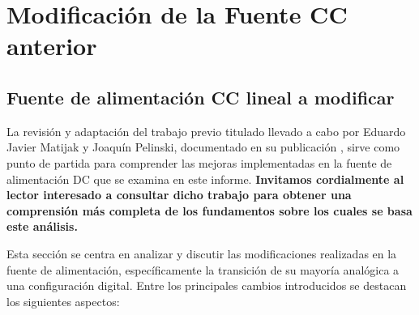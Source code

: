 \chapter{Modificación de la Fuente CC anterior}

\label{C:Sobre la fuente anterior}

\section{Fuente de alimentación CC lineal a modificar}
La revisión y adaptación del trabajo previo titulado  llevado a cabo por Eduardo Javier Matijak y Joaquín Pelinski, documentado en su publicación \cite{Fuente2023}, sirve como punto de partida para comprender las mejoras implementadas en la fuente de alimentación DC que se examina en este informe. \textbf{Invitamos cordialmente al lector interesado a consultar dicho trabajo para obtener una comprensión más completa de los fundamentos sobre los cuales se basa este análisis.} \par 
Esta sección se centra en analizar y discutir las modificaciones realizadas en la fuente de alimentación, específicamente la transición de su mayoría analógica a una configuración digital. Entre los principales cambios introducidos se destacan los siguientes aspectos:

